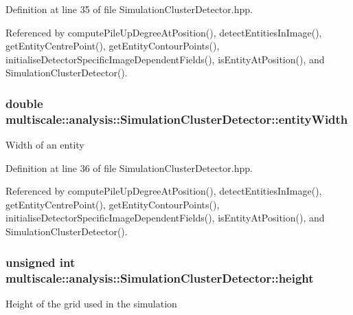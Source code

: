Definition at line 35 of file Simulation\-Cluster\-Detector.\-hpp.



Referenced by compute\-Pile\-Up\-Degree\-At\-Position(), detect\-Entities\-In\-Image(), get\-Entity\-Centre\-Point(), get\-Entity\-Contour\-Points(), initialise\-Detector\-Specific\-Image\-Dependent\-Fields(), is\-Entity\-At\-Position(), and Simulation\-Cluster\-Detector().

\hypertarget{classmultiscale_1_1analysis_1_1SimulationClusterDetector_a9212da88b787b8f9791f27d913b6d05d}{
\subsubsection[{entity\-Width}]{\setlength{\rightskip}{0pt plus 5cm}double multiscale\-::analysis\-::\-Simulation\-Cluster\-Detector\-::entity\-Width\hspace{0.3cm}{\ttfamily [private]}}}\label{classmultiscale_1_1analysis_1_1SimulationClusterDetector_a9212da88b787b8f9791f27d913b6d05d}
Width of an entity 

Definition at line 36 of file Simulation\-Cluster\-Detector.\-hpp.



Referenced by compute\-Pile\-Up\-Degree\-At\-Position(), detect\-Entities\-In\-Image(), get\-Entity\-Centre\-Point(), get\-Entity\-Contour\-Points(), initialise\-Detector\-Specific\-Image\-Dependent\-Fields(), is\-Entity\-At\-Position(), and Simulation\-Cluster\-Detector().

\hypertarget{classmultiscale_1_1analysis_1_1SimulationClusterDetector_a9d0a0fe5d9ea0f2516d07bf44b1da257}{
\subsubsection[{height}]{\setlength{\rightskip}{0pt plus 5cm}unsigned int multiscale\-::analysis\-::\-Simulation\-Cluster\-Detector\-::height\hspace{0.3cm}{\ttfamily [private]}}}\label{classmultiscale_1_1analysis_1_1SimulationClusterDetector_a9d0a0fe5d9ea0f2516d07bf44b1da257}
Height of the grid used in the simulation 

